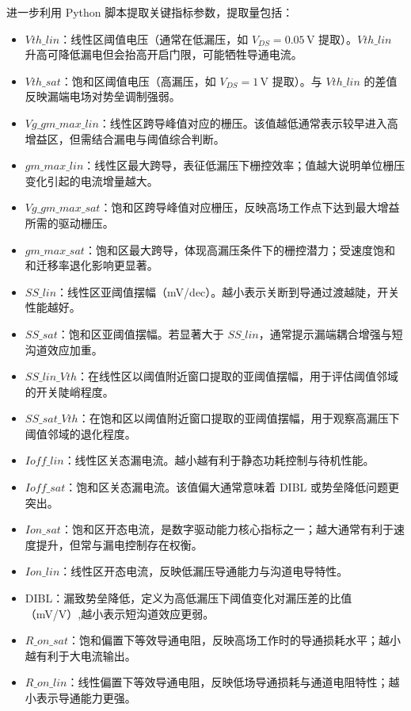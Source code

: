 \documentclass[11pt, a4paper, UTF8]{article}
\begin{document}
进一步利用 Python 脚本提取关键指标参数，提取量包括：
\begin{itemize}
    \item $Vth\_lin$：线性区阈值电压（通常在低漏压，如 $V_{DS}=0.05\,\mathrm{V}$ 提取）。$Vth\_lin$ 升高可降低漏电但会抬高开启门限，可能牺牲导通电流。
    \item $Vth\_sat$：饱和区阈值电压（高漏压，如 $V_{DS}=1\,\mathrm{V}$ 提取）。与 $Vth\_lin$ 的差值反映漏端电场对势垒调制强弱。
    \item $Vg\_{gm\_max\_lin}$：线性区跨导峰值对应的栅压。该值越低通常表示较早进入高增益区，但需结合漏电与阈值综合判断。
    \item $gm\_max\_lin$：线性区最大跨导，表征低漏压下栅控效率；值越大说明单位栅压变化引起的电流增量越大。
    \item $Vg\_{gm\_max\_sat}$：饱和区跨导峰值对应栅压，反映高场工作点下达到最大增益所需的驱动栅压。
    \item $gm\_max\_sat$：饱和区最大跨导，体现高漏压条件下的栅控潜力；受速度饱和和迁移率退化影响更显著。
    \item $SS\_lin$：线性区亚阈值摆幅（mV/dec）。越小表示关断到导通过渡越陡，开关性能越好。
    \item $SS\_sat$：饱和区亚阈值摆幅。若显著大于 $SS\_lin$，通常提示漏端耦合增强与短沟道效应加重。
    \item $SS\_lin\_Vth$：在线性区以阈值附近窗口提取的亚阈值摆幅，用于评估阈值邻域的开关陡峭程度。
    \item $SS\_sat\_Vth$：在饱和区以阈值附近窗口提取的亚阈值摆幅，用于观察高漏压下阈值邻域的退化程度。
    \item $Ioff\_lin$：线性区关态漏电流。越小越有利于静态功耗控制与待机性能。
    \item $Ioff\_sat$：饱和区关态漏电流。该值偏大通常意味着 DIBL 或势垒降低问题更突出。
    \item $Ion\_sat$：饱和区开态电流，是数字驱动能力核心指标之一；越大通常有利于速度提升，但常与漏电控制存在权衡。
    \item $Ion\_lin$：线性区开态电流，反映低漏压导通能力与沟道电导特性。
    \item DIBL：漏致势垒降低，定义为高低漏压下阈值变化对漏压差的比值（mV/V）,越小表示短沟道效应更弱。
    \item $R\_on\_sat$：饱和偏置下等效导通电阻，反映高场工作时的导通损耗水平；越小越有利于大电流输出。
    \item $R\_on\_lin$：线性偏置下等效导通电阻，反映低场导通损耗与通道电阻特性；越小表示导通能力更强。
\end{itemize}
\end{document}
